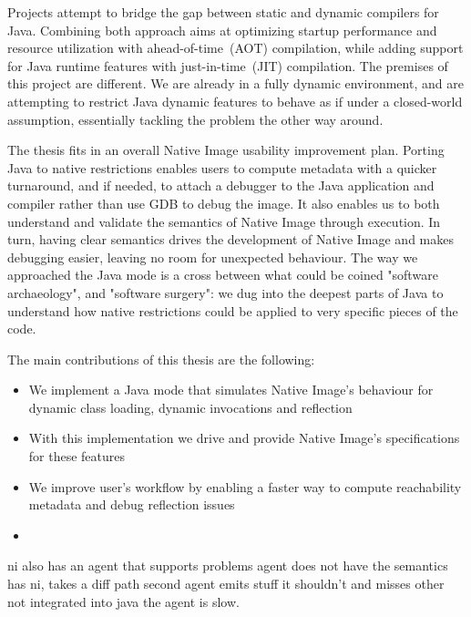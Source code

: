 Projects attempt to bridge the gap between static and dynamic compilers for Java. Combining both approach aims at optimizing startup performance and resource utilization with ahead-of-time~(AOT) compilation, while adding support for Java runtime features with just-in-time~(JIT) compilation. The premises of this project are different. We are already in a fully dynamic environment, and are attempting to restrict Java dynamic features to behave as if under a closed-world assumption, essentially tackling the problem the other way around.

The thesis fits in an overall Native Image usability improvement plan. Porting Java to native restrictions enables users to compute metadata with a quicker turnaround, and if needed, to attach a debugger to the Java application and compiler rather than use GDB to debug the image. It also enables us to both understand and validate the semantics of Native Image through execution. In turn, having clear semantics drives the development of Native Image and makes debugging easier, leaving no room for unexpected behaviour.
The way we approached the Java mode is a cross between what could be coined "software archaeology", and 
"software surgery": we dug into the deepest parts of Java to understand how native restrictions could be applied to very specific pieces of the code.

The main contributions of this thesis are the following:
\begin{itemize}
  \item We implement a Java mode that simulates Native Image's behaviour for dynamic class loading, dynamic invocations and reflection
  \item With this implementation we drive and provide Native Image's specifications for these features
  \item We improve user's workflow by enabling a faster way to compute reachability metadata and debug reflection issues
  \item {}
\end{itemize}


ni also has an agent that supports
problems agent does not have the semantics has ni, takes a diff path
second agent emits stuff it shouldn't and misses other not integrated into java
the agent is slow.